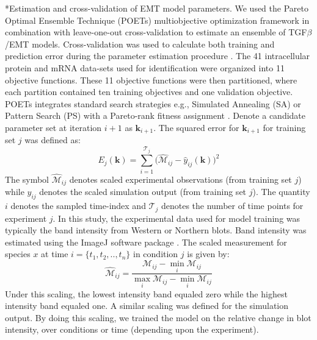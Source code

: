 \documentclass[12pt]{article}
\makeatletter
\renewcommand\subsection{\@startsection
	{subsection}{2}{0mm}
	{-0.05in}
	{-0.5\baselineskip}
	{\normalfont\normalsize\bfseries}}
\makeatother
\begin{document}
\newpage

\subsection*{Estimation and cross-validation of EMT model parameters.}
We used the Pareto Optimal Ensemble Technique (POETs) multiobjective optimization framework in combination with leave-one-out cross-validation to estimate an ensemble of TGF$\beta$/EMT models.
Cross-validation was used to calculate both training and prediction error during the parameter estimation procedure \cite{kohavi1995study}.
The 41 intracellular protein and mRNA data-sets used for identification were organized into 11 objective functions.
These 11 objective functions were then partitioned, where each partition contained ten training objectives and one validation objective.
POETs integrates standard search strategies e.g., Simulated Annealing (SA) or Pattern Search (PS)
with a Pareto-rank fitness assignment \cite{Song:2010fk}.
Denote a candidate parameter set at iteration $i+1$ as $\mathbf{k}_{i+1}$.
The squared error for $\mathbf{k}_{i+1}$ for training set $j$ was defined as:
\begin{equation}\label{eqn_cost2}
	E_{j}(\mathbf{k}) = \sum_{i=1}^{\mathcal{T}_{j}}\biggl(\hat{\mathcal{M}}_{ij}-\hat{y}_{ij}(\mathbf{k})\biggr)^2
\end{equation}
The symbol $\hat{\mathcal{M}}_{ij}$ denotes scaled experimental observations (from training set $j$) while $\hat{y}_{ij}$ denotes the scaled simulation output (from training set $j$).
The quantity $i$ denotes the sampled time-index and $\mathcal{T}_{j}$ denotes the number of time points for experiment $j$.
In this study, the experimental data used for model training was typically the band intensity from Western or Northern blots.
Band intensity was estimated using the ImageJ software package \cite{IMAGEJ}.
The scaled measurement for species $x$ at time $i=\{t_{1},t_{2},..,t_{n}\}$ in condition $j$ is given by:
\begin{equation}\label{norm_exp_data}
\hat{\mathcal{M}}_{ij} = \frac{\mathcal{M}_{ij} - \min_{i}\mathcal{M}_{ij}}{\max_{i}{\mathcal{M}_{ij}}-\min_{i}{\mathcal{M}_{ij}}}
\end{equation}
Under this scaling, the lowest intensity band equaled zero while the highest intensity band equaled one.
A similar scaling was defined for the simulation output. By doing this scaling, we trained the model on the relative change in blot intensity, over conditions or time (depending upon the experiment).
\end{document}
